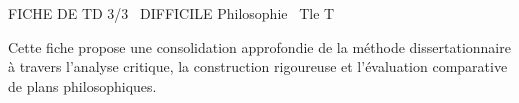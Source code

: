 \documentclass[11pt]{article}
\begin{document}
\begin{tcolorbox}[enhanced,colback=popink,colframe=popink,arc=10pt,boxrule=0pt,left=12pt,right=12pt,top=9pt,bottom=9pt]
{\color{white}\popxbold\small FICHE DE TD 3/3 \textbullet\ DIFFICILE \hfill Philosophie \textbullet\ Tle T\par}
\end{tcolorbox}
\vspace{4pt}
Cette fiche propose une consolidation approfondie de la méthode dissertationnaire à travers l'analyse critique, la construction rigoureuse et l'évaluation comparative de plans philosophiques.
\end{document}

